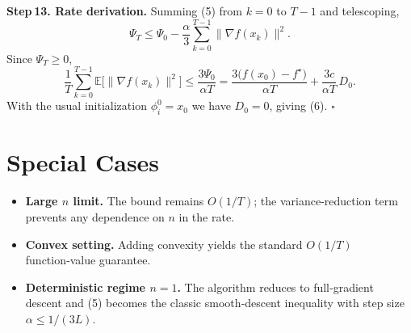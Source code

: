 \documentclass{article}
\newcommand{\E}{\mathbb{E}}
\begin{document}
\noindent\textbf{Step 13. Rate derivation.}  
Summing (5) from $k=0$ to $T-1$ and telescoping,
\[
\Psi_T \le \Psi_0-\frac{\alpha}{3}\sum_{k=0}^{T-1}\|\nabla f(x_k)\|^{2}.
\]
Since $\Psi_T\ge 0$,
\[
\frac{1}{T}\sum_{k=0}^{T-1}\E\!\bigl[\|\nabla f(x_k)\|^{2}\bigr]
\le \frac{3\Psi_0}{\alpha T}
   =\frac{3\bigl(f(x_0)-f^{\star}\bigr)}{\alpha T}
     +\frac{3c}{\alpha T}\,D_0 .
\]
With the usual initialization $\phi_i^{0}=x_0$ we have $D_0=0$, giving (6). $\square$

\section*{Special Cases}
\begin{itemize}
    \item \textbf{Large $n$ limit.} The bound remains $O(1/T)$; the variance‑reduction term prevents any dependence on $n$ in the rate.
    \item \textbf{Convex setting.} Adding convexity yields the standard $O(1/T)$ function‑value guarantee.
    \item \textbf{Deterministic regime $n=1$.} The algorithm reduces to full‑gradient descent and (5) becomes the classic smooth‑descent inequality with step size $\alpha\le1/(3L)$.
\end{itemize}

\end{document}
